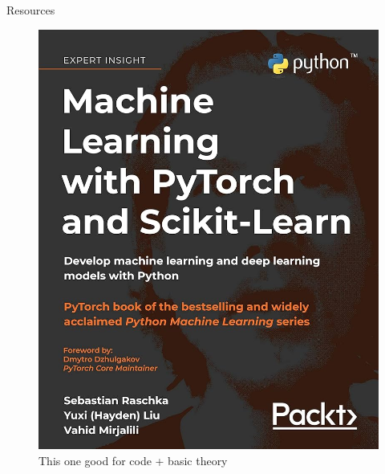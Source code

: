 \documentclass{beamer}
\begin{document}
\begin{frame}{Resources}
    \begin{figure}
        \centering
        \begin{minipage}{0.45\linewidth}
            \centering
            \includegraphics[width=\linewidth]{imgs/pytorch.jpg}
            \caption{This one good for code + basic theory}
        \end{minipage}
        \hfill
        \begin{minipage}{0.45\linewidth}
            \centering

\end{minipage}
\end{figure}
\end{frame}
\end{document}
